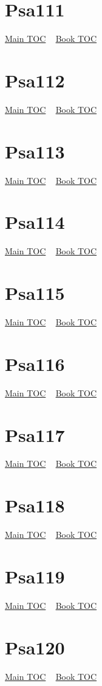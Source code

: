\documentclass{book}
\begin{document}
  \section{Psa111}\hyperlink{toc}{Main TOC} ~ \hyperref[subsec:Psa]{Book TOC} 
  \section{Psa112}\hyperlink{toc}{Main TOC} ~ \hyperref[subsec:Psa]{Book TOC} 
  \section{Psa113}\hyperlink{toc}{Main TOC} ~ \hyperref[subsec:Psa]{Book TOC} 
  \section{Psa114}\hyperlink{toc}{Main TOC} ~ \hyperref[subsec:Psa]{Book TOC} 
  \section{Psa115}\hyperlink{toc}{Main TOC} ~ \hyperref[subsec:Psa]{Book TOC} 
  \section{Psa116}\hyperlink{toc}{Main TOC} ~ \hyperref[subsec:Psa]{Book TOC} 
  \section{Psa117}\hyperlink{toc}{Main TOC} ~ \hyperref[subsec:Psa]{Book TOC} 
  \section{Psa118}\hyperlink{toc}{Main TOC} ~ \hyperref[subsec:Psa]{Book TOC} 
  \section{Psa119}\hyperlink{toc}{Main TOC} ~ \hyperref[subsec:Psa]{Book TOC} 
  \section{Psa120}\hyperlink{toc}{Main TOC} ~ \hyperref[subsec:Psa]{Book TOC} 
\end{document}
